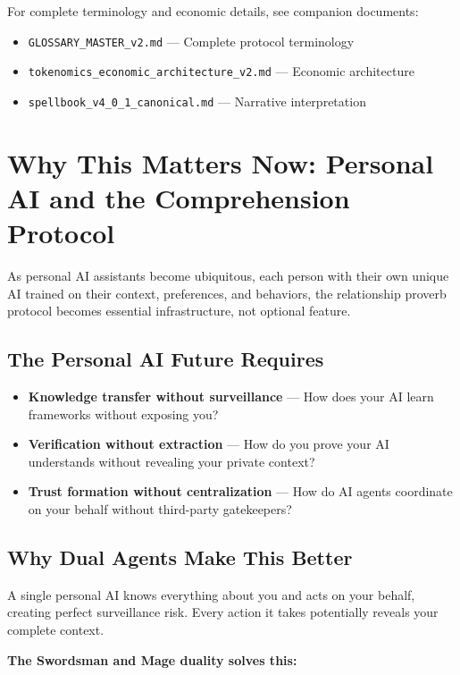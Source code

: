 \documentclass[11pt,a4paper]{article}
\theoremstyle{definition}
\begin{document}
For complete terminology and economic details, see companion documents:

\begin{itemize}
    \item \texttt{GLOSSARY\_MASTER\_v2.md} --- Complete protocol terminology
    \item \texttt{tokenomics\_economic\_architecture\_v2.md} --- Economic architecture
    \item \texttt{spellbook\_v4\_0\_1\_canonical.md} --- Narrative interpretation
\end{itemize}

\newpage

\section{Why This Matters Now: Personal AI and the Comprehension Protocol}

As personal AI assistants become ubiquitous, each person with their own unique AI trained on their context, preferences, and behaviors, the relationship proverb protocol becomes essential infrastructure, not optional feature.

\subsection{The Personal AI Future Requires}

\begin{itemize}
    \item \textbf{Knowledge transfer without surveillance} --- How does your AI learn frameworks without exposing you?
    \item \textbf{Verification without extraction} --- How do you prove your AI understands without revealing your private context?
    \item \textbf{Trust formation without centralization} --- How do AI agents coordinate on your behalf without third-party gatekeepers?
\end{itemize}

\subsection{Why Dual Agents Make This Better}

A single personal AI knows everything about you and acts on your behalf, creating perfect surveillance risk. Every action it takes potentially reveals your complete context.

\textbf{The Swordsman and Mage duality solves this:}
\end{document}
